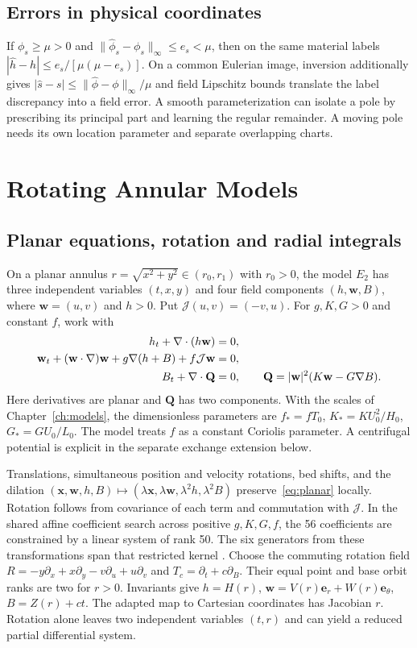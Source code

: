 \documentclass[12pt,a4paper,oneside]{report}
\numberwithin{equation}{chapter}
\theoremstyle{remark}\newtheorem{remark}[theorem]{Remark}
\begin{document}
\section{Errors in physical coordinates}
If $\phi_s\ge\mu>0$ and $\|\widehat\phi_s-\phi_s\|_\infty\le e_s<\mu$, then on the same material labels
$|\widehat h-h|\le e_s/[\mu(\mu-e_s)]$. On a common Eulerian image, inversion additionally gives $|\widehat s-s|\le\|\widehat\phi-\phi\|_\infty/\mu$ and field Lipschitz bounds translate the label discrepancy into a field error. A smooth parameterization can isolate a pole by prescribing its principal part and learning the regular remainder. A moving pole needs its own location parameter and separate overlapping charts.

\chapter{Rotating Annular Models}\label{ch:continuation}
\section{Planar equations, rotation and radial integrals}
On a planar annulus $r=\sqrt{x^2+y^2}\in(r_0,r_1)$ with $r_0>0$, the model $E_2$ has three independent variables $(t,x,y)$ and four field components $(h,\mathbf w,B)$, where $\mathbf w=(u,v)$ and $h>0$. Put $\mathcal J(u,v)=(-v,u)$. For $g,K,G>0$ and constant $f$, work with
\begin{align}\label{eq:planar}
 h_t+\nabla\cdot(h\mathbf w)&=0,\notag\\
 \mathbf w_t+(\mathbf w\cdot\nabla)\mathbf w+g\nabla(h+B)+f\mathcal J\mathbf w&=0,\notag\\
 B_t+\nabla\cdot\mathbf Q&=0,\qquad
 \mathbf Q=|\mathbf w|^2(K\mathbf w-G\nabla B).
\end{align}
Here derivatives are planar and $\mathbf Q$ has two components. With the scales of Chapter~\ref{ch:models}, the dimensionless parameters are $f_* = f T_0$, $K_* = K U_0^2/H_0$, $G_* = G U_0/L_0$. The model treats $f$ as a constant Coriolis parameter. A centrifugal potential is explicit in the separate exchange extension below.

Translations, simultaneous position and velocity rotations, bed shifts, and the dilation $(\mathbf x,\mathbf w,h,B)\mapsto(\lambda\mathbf x,\lambda\mathbf w,\lambda^2h,\lambda^2B)$ preserve~\eqref{eq:planar} locally. Rotation follows from covariance of each term and commutation with $\mathcal J$. In the shared affine coefficient search across positive $g,K,G,f$, the 56 coefficients are constrained by a linear system of rank 50. The six generators from these transformations span that restricted kernel \cite{theoremartifact}. Choose the commuting rotation field
$R=-y\partial_x+x\partial_y-v\partial_u+u\partial_v$ and $T_c=\partial_t+c\partial_B$. Their equal point and base orbit ranks are two for $r>0$. Invariants give $h=H(r)$, $\mathbf w=V(r)\mathbf e_r+W(r)\mathbf e_\theta$, $B=Z(r)+ct$. The adapted map to Cartesian coordinates has Jacobian $r$. Rotation alone leaves two independent variables $(t,r)$ and can yield a reduced partial differential system.
\end{document}
